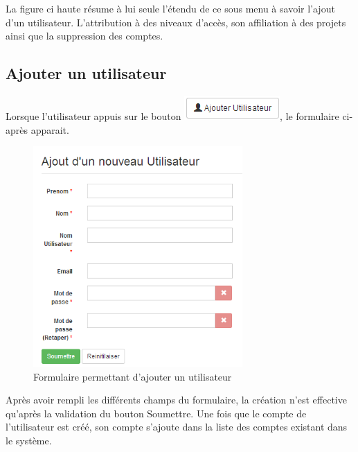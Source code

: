 \documentclass[12pt,a4paper]{report}
\begin{document}
La figure ci haute résume à lui seule l'étendu de ce sous menu à savoir l'ajout d'un utilisateur. L'attribution à des niveaux  d'accès, son affiliation à des projets ainsi que la suppression des comptes.

\subsection{Ajouter un utilisateur}
Lorsque l'utilisateur appuis sur le bouton \includegraphics[scale=1]{pic/AddUser.png}, le formulaire ci-après apparait.
\begin{figure}[h]
\begin{center}
\includegraphics[width=8cm]{pic/FormAddUser.png}
\end{center}
\caption{Formulaire permettant d'ajouter un utilisateur}
\label{Formulaire permettant d'ajouter un utilisateur}
\end{figure}
\newpage

Après avoir rempli les différents champs du formulaire, la création n'est effective qu'après la validation du bouton Soumettre.
Une fois que le compte de l'utilisateur est créé, son compte s'ajoute dans la liste des comptes existant dans le système.
\end{document}
